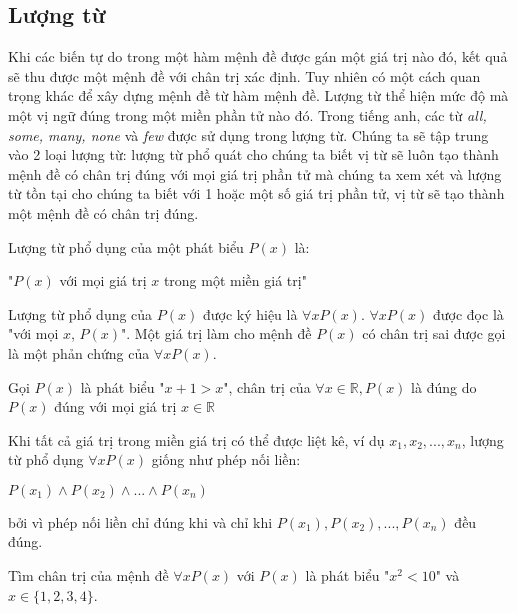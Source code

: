 \documentclass[11pt,fleqn]{book} %
\begin{document}
    \subsection{Lượng từ}
        
        Khi các biến tự do trong một hàm mệnh đề được gán một giá trị nào đó, kết quả sẽ thu được một mệnh đề với chân trị xác định. Tuy nhiên có một cách quan trọng khác để xây dựng mệnh đề từ hàm mệnh đề. Lượng từ thể hiện mức độ mà một vị ngữ đúng trong một miền phần tử nào đó. Trong tiếng anh, các từ \textit{all, some, many, none} và \textit{few} được sử dụng trong lượng từ. Chúng ta sẽ tập trung vào 2 loại lượng từ: lượng từ phổ quát cho chúng ta biết vị từ sẽ luôn tạo thành mệnh đề có chân trị đúng với mọi giá trị phần tử mà chúng ta xem xét và lượng từ tồn tại cho chúng ta biết với 1 hoặc một số giá trị phần tử, vị từ sẽ tạo thành một mệnh đề có chân trị đúng.
        
        \begin{definition}
            Lượng từ phổ dụng của một phát biểu $P(x)$ là:
            \begin{center}
                "$P(x)$ với mọi giá trị $x$ trong một miền giá trị" 
            \end{center}
            Lượng từ phổ dụng của $P(x)$ được ký hiệu là $\forall x P(x)$. $\forall x P(x)$ được đọc là "với mọi $x$, $P(x)$". Một giá trị làm cho mệnh đề $P(x)$ có chân trị sai được gọi là một phản chứng của $\forall x P(x)$.
        \end{definition}
        
        \begin{example}
            Gọi $P(x)$ là phát biểu "$x + 1 > x$", chân trị của $\forall x \in \mathbb{R}, P(x)$ là đúng do $P(x)$ đúng với mọi giá trị $x \in \mathbb{R}$
        \end{example}
        
        Khi tất cả giá trị trong miền giá trị có thể được liệt kê, ví dụ $x_1, x_2, ..., x_n$, lượng từ phổ dụng $\forall x P(x)$ giống như phép nối liền:
        \begin{center}
            $P(x_1) \land P(x_2) \land ... \land P(x_n)$
        \end{center}
        bởi vì phép nối liền chỉ đúng khi và chỉ khi $P(x_1), P(x_2), ..., P(x_n)$ đều đúng.
        
        \begin{example}
            Tìm chân trị của mệnh đề $\forall x P(x)$ với $P(x)$ là phát biểu "$x^2 < 10$" và $x \in \{1, 2, 3, 4\}$.
        \end{example}
        
\end{document}
